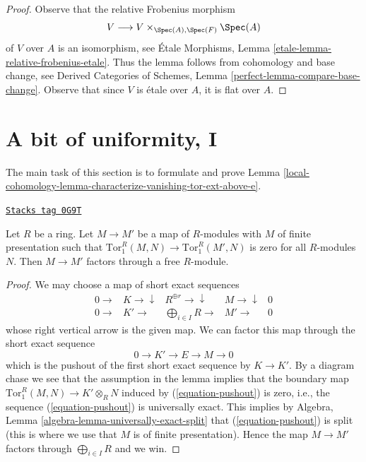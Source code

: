 \begin{proof}
Observe that the relative Frobenius morphism
$$
V \longrightarrow V \times_{\Spec(A), \Spec(F)} \Spec(A)
$$
of $V$ over $A$ is an isomorphism, see
\'Etale Morphisms, Lemma \ref{etale-lemma-relative-frobenius-etale}.
Thus the lemma follows from cohomology and base change, see
Derived Categories of Schemes, Lemma
\ref{perfect-lemma-compare-base-change}.
Observe that since $V$ is \'etale over $A$, it is flat over $A$.
\end{proof}

\section{A bit of uniformity, I}
\label{local-cohomology-section-uniform-vanishing}
The main task of this section is to formulate and prove
Lemma \ref{local-cohomology-lemma-characterize-vanishing-tor-ext-above-e}.

\begin{lemma}
\label{local-cohomology-lemma-map-tor-1-zero}
\href{https://stacks.math.columbia.edu/tag/0G9T}{\texttt{Stacks tag 0G9T}}

Let $R$ be a ring. Let $M \to M'$ be a map of $R$-modules with
$M$ of finite presentation
such that $\text{Tor}_1^R(M, N) \to \text{Tor}_1^R(M', N)$ is zero for all
$R$-modules $N$. Then $M \to M'$ factors through a free $R$-module.
\end{lemma}

\begin{proof}
We may choose a map of short exact sequences
$$
\begin{array}{ccccc}0 \longrightarrow & K \longrightarrow\downarrow & R^{\oplus r} \longrightarrow\downarrow & M \longrightarrow\downarrow & 0 \\ 0 \longrightarrow & K' \longrightarrow & \bigoplus_{i \in I} R \longrightarrow & M' \longrightarrow & 0\end{array}
$$
whose right vertical arrow is the given map.
We can factor this map through the short exact sequence
\begin{equation}
\label{equation-pushout}
0 \to K' \to E \to M \to 0
\end{equation}
which is the pushout of the first short exact sequence by $K \to K'$.
By a diagram chase we see that the assumption in the lemma
implies that the boundary map $\text{Tor}_1^R(M, N) \to K' \otimes_R N$
induced by (\ref{equation-pushout}) is zero, i.e., the sequence
(\ref{equation-pushout}) is universally exact. This implies by
Algebra, Lemma \ref{algebra-lemma-universally-exact-split}
that (\ref{equation-pushout}) is split (this is where we use that
$M$ is of finite presentation). Hence the map $M \to M'$
factors through $\bigoplus_{i \in I} R$ and we win.
\end{proof}

